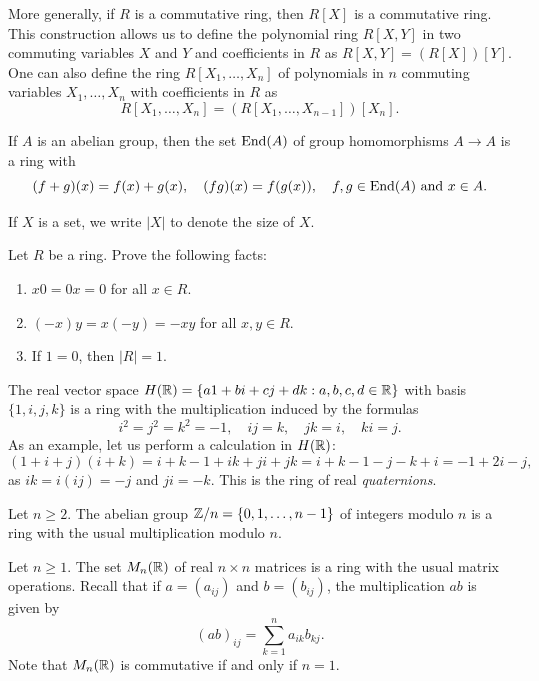 More generally, if $R$ is a commutative ring, then $R[X]$ is a commutative ring. This construction
allows us to define 
the polynomial ring $R[X,Y]$ in two commuting variables $X$ and $Y$ and coefficients in $R$ as 
$R[X,Y]=(R[X])[Y]$. One can also define the ring  
$R[X_1,\dots,X_n]$ of polynomials 
in $n$ commuting variables $X_1,\dots,X_n$ with coefficients in $R$ as 
\[
R[X_1,\dots,X_n]
=(R[X_1,\dots,X_{n-1}])[X_n].
\]

\begin{example}
    If $A$ is an abelian group, then 
    the set 
    $\operatorname{End}(A)$ of group homomorphisms $A\to A$ is a ring with
    \[
    (f+g)(x)=f(x)+g(x),\quad
    (fg)(x)=f(g(x)),\quad f,g\in\operatorname{End}(A)\text{ and }x\in A.
    \]
\end{example}

If $X$ is a set, we write $|X|$ to denote 
the size of $X$. 

\begin{exercise}
    \label{xca:basic_formulas}
Let $R$ be a ring. Prove the following facts: 
\begin{enumerate}
    \item $x0=0x=0$ for all $x\in R$.
    \item $(-x)y=x(-y)=-xy$ for all $x,y\in R$.
    \item If $1=0$, then $|R|=1$. 
\end{enumerate}
\end{exercise}

\begin{example}
    The real vector space $H(\mathbb{R})=\{a1+bi+cj+dk:a,b,c,d\in\mathbb{R}\}$ with basis $\{1,i,j,k\}$ 
    is a ring with the multiplication induced by
    the formulas 
    \[
    i^2=j^2=k^2=-1,
    \quad ij=k,
    \quad jk=i,
    \quad ki=j.
    \]
    As an example, let us perform a calculation in $H(\mathbb{R})$: 
    \[
    (1+i+j)(i+k)=i+k-1+ik+ji+jk=i+k-1-j-k+i=-1+2i-j,
    \]
    as $ik=i(ij)=-j$ and $ji=-k$. This is the ring of real \emph{quaternions}.
\end{example}

\begin{example}
    Let $n\geq2$.  The abelian group $\mathbb{Z}/n=\{0,1,\dots,n-1\}$ of integers
    modulo $n$ is a ring with the usual multiplication modulo $n$. 
\end{example}

\begin{example}
    Let $n\geq1$. 
    The set $M_n(\mathbb{R})$ of real $n\times n$ matrices is a ring with the usual matrix operations. Recall
    that if $a=(a_{ij})$ and $b=(b_{ij})$, the multiplication $ab$ is given by
    \[
    (ab)_{ij}=\sum_{k=1}^n a_{ik}b_{kj}.
    \]
    Note that $M_n(\mathbb{R})$ is commutative if and only if $n=1$. 
\end{example}

